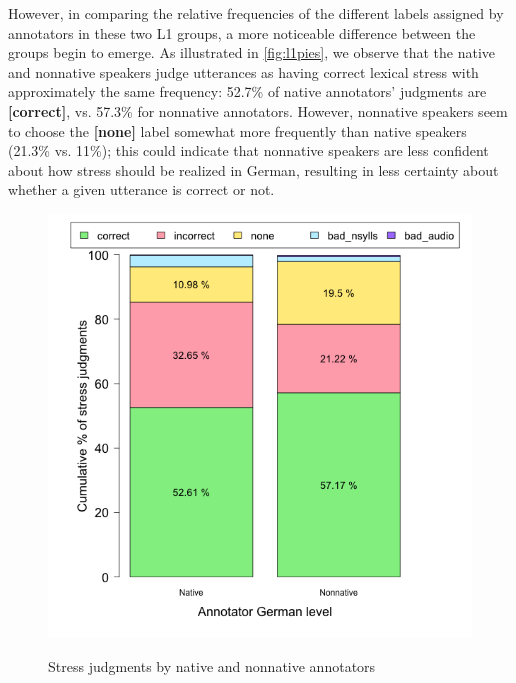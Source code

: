 		However, in comparing the relative frequencies of the different labels assigned by annotators in these two L1 groups, a more noticeable difference between the groups begin to emerge. As illustrated in \cref{fig:l1pies}, we observe that the native and nonnative speakers judge utterances as having correct lexical stress with approximately the same frequency: 52.7\% of native annotators' judgments are \textbf{[correct]}, vs. 57.3\% for nonnative annotators. However, nonnative speakers seem to choose the \textbf{[none]}
		label somewhat more frequently than native speakers (21.3\% vs. 11\%); this could indicate that nonnative speakers are less confident about how stress should be realized in German, resulting in less certainty about whether a given utterance is correct or not. 
		
		
			\begin{figure}[htb]
				\centering
				\caption{Stress judgments by native and nonnative annotators}
				\includegraphics[width=.9\textwidth]{img/plots/pctJudgmentsByL1-NoTitle}
				\label{fig:agreement:l1bars}
			\end{figure}
	
			
